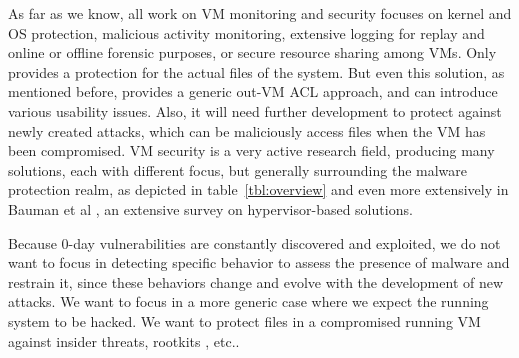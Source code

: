 \par As far as we know, all work on \ac{VM} monitoring and security focuses on kernel and \ac{OS} protection, malicious activity monitoring, extensive logging for replay and online or offline forensic purposes, or secure resource sharing among \ac{VM}s. Only \cite{baliga2008automated} provides a protection for the actual files of the system. But even this solution, as mentioned before, provides a generic out-\ac{VM} \ac{ACL} approach, and can introduce various usability issues. Also, it will need further development to protect against newly created attacks, which can be maliciously access files when the \ac{VM} has been compromised. \ac{VM} security is a very active research field, producing many solutions, each with different focus, but generally surrounding the malware protection realm, as depicted in table~\ref{tbl:overview} and even more extensively in Bauman et al \cite{bauman2015survey}, an extensive survey on hypervisor-based solutions.


\par Because 0-day vulnerabilities are constantly discovered and exploited, we do not want to focus in detecting specific behavior to assess the presence of malware and restrain it, since these behaviors change and evolve with the development of new attacks. We want to focus in a more generic case where we expect the running system to be hacked. We want to protect files in a compromised running \ac{VM} against insider threats, rootkits , etc.. 



